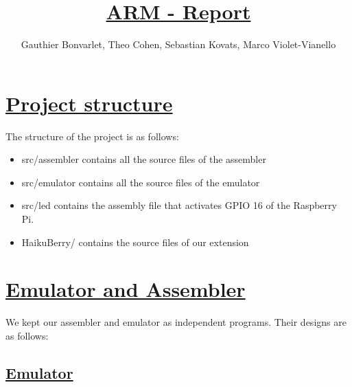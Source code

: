 \documentclass[10pt]{article}
\begin{document}
\title{\underline{ARM - Report}}
\author{Gauthier Bonvarlet, Theo Cohen, Sebastian Kovats, Marco Violet-Vianello}
\maketitle
\section{\underline{Project structure}}
\bigskip

The structure of the project is as follows:
\begin{itemize}
\item src/assembler contains all the source files of the assembler
\item src/emulator contains all the source files of the emulator
\item src/led contains the assembly file that activates GPIO 16 of the Raspberry Pi.
\item HaikuBerry/ contains the source files of our extension
\end{itemize}

\section{\underline{Emulator and Assembler}}
\bigskip

We kept our assembler and emulator as independent programs. Their designs are as follows:

\subsection{\underline{Emulator}}
\bigskip
\end{document}
